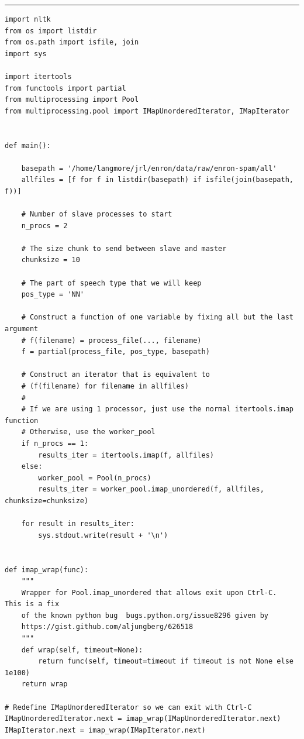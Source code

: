 \rule{\textwidth}{2pt}
\begin{verbatim}
import nltk
from os import listdir
from os.path import isfile, join
import sys

import itertools
from functools import partial
from multiprocessing import Pool
from multiprocessing.pool import IMapUnorderedIterator, IMapIterator


def main():

    basepath = '/home/langmore/jrl/enron/data/raw/enron-spam/all'
    allfiles = [f for f in listdir(basepath) if isfile(join(basepath, f))]

    # Number of slave processes to start
    n_procs = 2

    # The size chunk to send between slave and master
    chunksize = 10

    # The part of speech type that we will keep
    pos_type = 'NN'

    # Construct a function of one variable by fixing all but the last argument
    # f(filename) = process_file(..., filename)
    f = partial(process_file, pos_type, basepath)

    # Construct an iterator that is equivalent to
    # (f(filename) for filename in allfiles)
    #
    # If we are using 1 processor, just use the normal itertools.imap function
    # Otherwise, use the worker_pool
    if n_procs == 1:
        results_iter = itertools.imap(f, allfiles)
    else:
        worker_pool = Pool(n_procs)
        results_iter = worker_pool.imap_unordered(f, allfiles, chunksize=chunksize)

    for result in results_iter:
        sys.stdout.write(result + '\n')


def imap_wrap(func):
    """
    Wrapper for Pool.imap_unordered that allows exit upon Ctrl-C.  This is a fix
    of the known python bug  bugs.python.org/issue8296 given by 
    https://gist.github.com/aljungberg/626518
    """
    def wrap(self, timeout=None):
        return func(self, timeout=timeout if timeout is not None else 1e100)
    return wrap

# Redefine IMapUnorderedIterator so we can exit with Ctrl-C
IMapUnorderedIterator.next = imap_wrap(IMapUnorderedIterator.next)
IMapIterator.next = imap_wrap(IMapIterator.next)
\end{verbatim}

